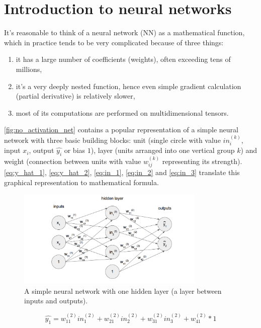 \documentclass[11pt, a4paper]{article}
\begin{document}
\section{Introduction to neural networks} \label{introduction_to_nn}
It's reasonable to think of a neural network (NN) as a mathematical function, which in practice tends to be very complicated because of three things:
\begin{enumerate}[1)]
\item it has a large number of coefficients (weights), often exceeding tens of millions,
\item it's a very deeply nested function, hence even simple gradient calculation (partial derivative) is relatively slower,
\item most of its computations are performed on multidimensional tensors.
\end{enumerate}
\autoref{fig:no_activation_net} contains a popular representation of a simple neural network with three basic building blocks: unit (single circle with value $in_i^{(k)}$, input $x_i$, output $\hat{y_i}$ or bias $1$), layer (units arranged into one vertical group $k$) and weight (connection between units with value $w_{ij}^{(k)}$ representing its strength). \autoref{eq:y_hat_1}, \ref{eq:y_hat_2}, \ref{eq:in_1}, \ref{eq:in_2} and \ref{eq:in_3} translate this graphical representation to mathematical formula.\\

\begin{figure}[h]
\includegraphics[width=0.8\textwidth]{no_activation_net}
\centering
\caption[Prosta sieć neuronowa z jedną warstwą ukrytą]{A simple neural network with one hidden layer (a layer between inputs and outputs).}
\label{fig:no_activation_net}
\end{figure}

\begin{equation} \label{eq:y_hat_1}
\hat{y_1} = w_{11}^{(2)}in_1^{(2)} + w_{21}^{(2)}in_2^{(2)} + w_{31}^{(2)}in_3^{(2)} + w_{41}^{(2)} * 1 
\end{equation}
\end{document}
